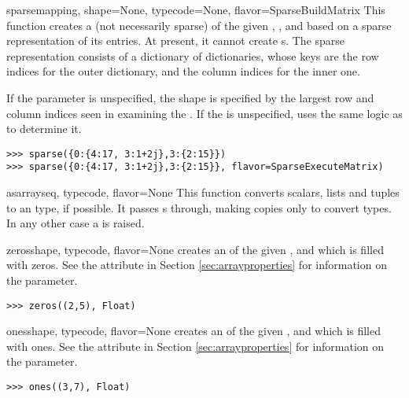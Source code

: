 \begin{funcdesc}{sparse}{mapping, shape=None, typecode=None, flavor=SparseBuildMatrix}
  This function creates a (not necessarily sparse)  of
  the given , , and  based on
  a sparse representation of its entries. At present, it cannot create
  s. The sparse representation consists of a dictionary
  of dictionaries, whose keys are the row indices for the outer dictionary,
  and the column indices for the inner one.

  If the  parameter is unspecified, the shape is specified by
  the largest row and column indices seen in examining the .
  If the  is unspecified,  uses the same
  logic as  to determine it.
\begin{verbatim}
>>> sparse({0:{4:17, 3:1+2j},3:{2:15}})
>>> sparse({0:{4:17, 3:1+2j},3:{2:15}}, flavor=SparseExecuteMatrix)
\end{verbatim}
\end{funcdesc}

\begin{funcdesc}{asarray}{seq, typecode, flavor=None}
  This function converts scalars, lists and tuples to an
   type, if possible. It passes s through,
  making copies only to convert types.  In any other case a
   is raised.
\end{funcdesc}

\begin{funcdesc}{zeros}{shape, typecode, flavor=None}
   creates an  of the given ,
   and  which is filled with zeros. See the
   attribute in Section \ref{sec:arrayproperties} for
  information on the  parameter.
\begin{verbatim}
>>> zeros((2,5), Float)
\end{verbatim}
\end{funcdesc}

\begin{funcdesc}{ones}{shape, typecode, flavor=None}
   creates an  of the given ,
   and  which is filled with ones. See the
   attribute in Section \ref{sec:arrayproperties} for
  information on the  parameter.
\begin{verbatim}
>>> ones((3,7), Float)
\end{verbatim}
\end{funcdesc}

